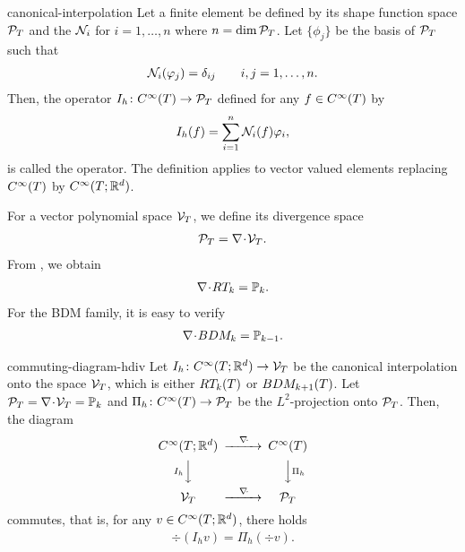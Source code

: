 \begin{Definition}{canonical-interpolation}
  Let a finite element be defined by its shape function space
  $\mathcal P_\cell$ and the  $\nodal_i$
  for $i=1,\dots,n$ where $n=\dim\mathcal P_\cell$. Let $\{\phi_j\}$
  be the basis of $\mathcal P_\cell$ such that
  \begin{gather*}
    \nodal_i(\phi_j) = \delta_{ij}
    \qquad i,j=1,\dots,n.
  \end{gather*}
  Then, the operator $I_h\colon C^\infty(\cell)\to \mathcal P_\cell$
  defined for any $f\in C^\infty(\cell)$ by
  \begin{gather}
    I_h(f) = \sum_{i=1}^n \nodal_i(f) \phi_i,
  \end{gather}
  is called the  operator. The
  definition applies to vector valued elements replacing
  $C^\infty(\cell)$ by $C^\infty(\cell;\R^d)$.
\end{Definition}

\begin{remark}
  For a vector polynomial space $\mathcal V_\cell$, we define its
  divergence space
  \begin{gather*}
    \mathcal P_\cell = \div \mathcal V_\cell.
  \end{gather*}
  From , we obtain
  \begin{gather}
    \label{eq:darcy:37}
    \div RT_k = \P_k.
  \end{gather}
  For the BDM family, it is easy to verify
  \begin{gather*}
    \div BDM_k = \P_{k-1}.
  \end{gather*}
\end{remark}

\begin{Lemma}{commuting-diagram-hdiv}
  Let $I_h\colon C^\infty(\cell;\R^d)\to \mathcal V_\cell$ be the
  canonical interpolation onto the space $\mathcal V_\cell$, which is
  either $RT_k(\cell)$ or $BDM_{k+1}(\cell)$. Let $\mathcal P_\cell = \div
  \mathcal V_\cell = \P_k$ and $\Pi_h\colon C^\infty(\cell)\to \mathcal
  P_\cell$ be the $L^2$-projection onto $\mathcal P_\cell$. Then, the
  diagram
  \begin{gather}
    \label{eq:darcy:35}
    \begin{CD}
      C^\infty(\cell;\R^d) @>\div>> C^\infty(\cell) \\
      @V{I_h}VV @VV{\Pi_h}V\\
      \mathcal V_\cell @>\div>> \mathcal P_\cell
    \end{CD}
  \end{gather}
  commutes, that is, for any $v\in C^\infty(\cell;\R^d)$, there holds
  \begin{gather}
    \label{eq:darcy:36}
    \div (I_h v) = \Pi_h(\div v).
  \end{gather}
\end{Lemma}

